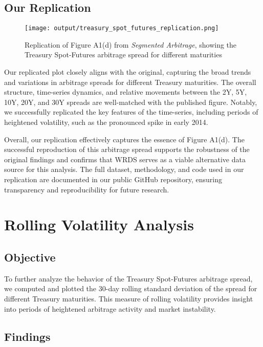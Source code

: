 \documentclass{article}
\begin{document}
\subsection{Our Replication}

\begin{figure}[h]
  \centering
  \texttt{[image: output/treasury\_spot\_futures\_replication.png]}
  \caption{Replication of Figure A1(d) from \textit{Segmented Arbitrage}, showing the Treasury Spot-Futures arbitrage spread for different maturities}
  \label{fig:treasury_spot_futures_replication}
\end{figure}




Our replicated plot closely aligns with the original, capturing the broad trends and variations in arbitrage spreads for different Treasury maturities. The overall structure, time-series dynamics, and relative movements between the 2Y, 5Y, 10Y, 20Y, and 30Y spreads are well-matched with the published figure. Notably, we successfully replicated the key features of the time-series, including periods of heightened volatility, such as the pronounced spike in early 2014.

Overall, our replication effectively captures the essence of Figure A1(d). The successful reproduction of this arbitrage spread supports the robustness of the original findings and confirms that WRDS serves as a viable alternative data source for this analysis. The full dataset, methodology, and code used in our replication are documented in our public GitHub repository, ensuring transparency and reproducibility for future research.


\newpage


\section{Rolling Volatility Analysis}
\subsection{Objective}

To further analyze the behavior of the Treasury Spot-Futures arbitrage spread, we computed and plotted the 30-day rolling standard deviation of the spread for different Treasury maturities. This measure of rolling volatility provides insight into periods of heightened arbitrage activity and market instability.

\subsection{Findings}
\end{document}
